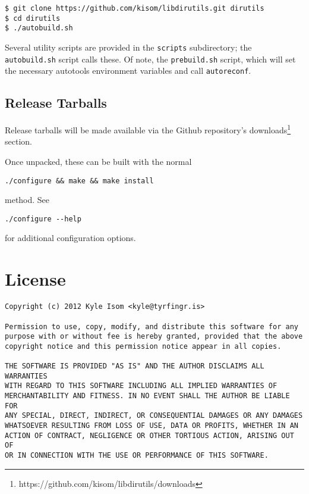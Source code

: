 \documentclass[10pt,letterpaper]{article}
\begin{document}
\begin{verbatim}
$ git clone https://github.com/kisom/libdirutils.git dirutils
$ cd dirutils
$ ./autobuild.sh
\end{verbatim}

Several utility scripts are provided in the \verb|scripts| subdirectory;
the \verb|autobuild.sh| script calls these. Of note, the \verb|prebuild.sh|
script, which will set the necessary autotools environment variables and call
\verb|autoreconf|.
\subsection*{Release Tarballs}
Release tarballs will be made available via the Github repository's
downloads\footnote{https://github.com/kisom/libdirutils/downloads} section.

Once unpacked, these can be built with the normal

\begin{verbatim}
./configure && make && make install
\end{verbatim}

method. See

\begin{verbatim}
./configure --help
\end{verbatim}

for additional configuration options.

\section*{License}
\begin{verbatim}
Copyright (c) 2012 Kyle Isom <kyle@tyrfingr.is>

Permission to use, copy, modify, and distribute this software for any
purpose with or without fee is hereby granted, provided that the above 
copyright notice and this permission notice appear in all copies.

THE SOFTWARE IS PROVIDED "AS IS" AND THE AUTHOR DISCLAIMS ALL WARRANTIES
WITH REGARD TO THIS SOFTWARE INCLUDING ALL IMPLIED WARRANTIES OF
MERCHANTABILITY AND FITNESS. IN NO EVENT SHALL THE AUTHOR BE LIABLE FOR
ANY SPECIAL, DIRECT, INDIRECT, OR CONSEQUENTIAL DAMAGES OR ANY DAMAGES
WHATSOEVER RESULTING FROM LOSS OF USE, DATA OR PROFITS, WHETHER IN AN
ACTION OF CONTRACT, NEGLIGENCE OR OTHER TORTIOUS ACTION, ARISING OUT OF
OR IN CONNECTION WITH THE USE OR PERFORMANCE OF THIS SOFTWARE. 
\end{verbatim}
\end{document}
